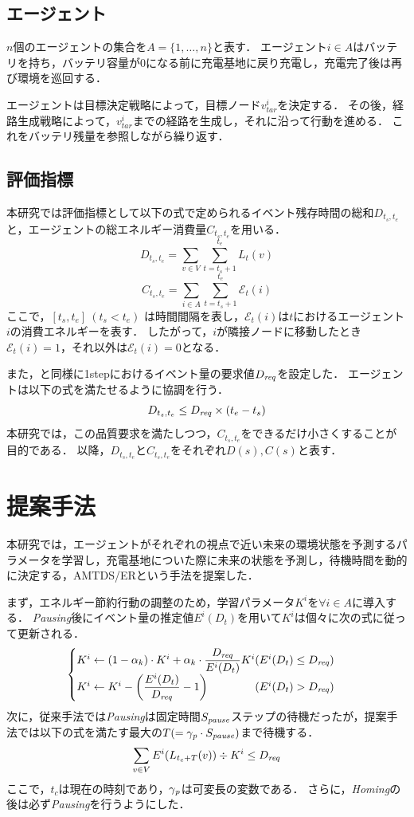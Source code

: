 \documentclass[11pt,a4j,twocolumn]{jarticle}
\def\AgentSet{A}
\def\Dreq{{D_{\it req}}}
\def\En{\mathcal{E}}
\def\PausingInt{{S_{\it pause}}}
\def\PauseTimeFactor{{\gamma_{\it p}}}
\begin{document}
\subsection{エージェント}
$n$個のエージェントの集合を$\AgentSet=\{1,\dots ,n\}$と表す．
エージェント$i\in\AgentSet$はバッテリを持ち，バッテリ容量が0になる前に充電基地に戻り充電し，充電完了後は再び環境を巡回する．
\par

エージェントは目標決定戦略によって，目標ノード$v^i_{tar}$を決定する．
その後，経路生成戦略によって，$v^i_{tar}$までの経路を生成し，それに沿って行動を進める．
これをバッテリ残量を参照しながら繰り返す．

\subsection{評価指標}
本研究では評価指標として以下の式で定められるイベント残存時間の総和$D_{t_s,t_e}$と，エージェントの総エネルギー消費量$C_{t_s,t_e}$を用いる．
%
\[
  D_{t_s,t_e} = \sum_{v \in V} \sum^{t_e}_{t=t_s+1} L_t(v)
\]
%
\[
  C_{t_s,t_e} = \sum_{i \in \AgentSet} \sum^{t_e}_{t=t_s+1} \En_t(i)
\]
%
ここで，$[t_s,t_e]~(t_s < t_e)$ は時間間隔を表し，$\En_t(i)$は$t$におけるエージェント$i$の消費エネルギーを表す．
したがって，$i$が隣接ノードに移動したとき$\En_t(i)=1$，それ以外は$\En_t(i)=0$となる．
\par
また，\cite{Wu2019}と同様に1stepにおけるイベント量の要求値$\Dreq$を設定した．
エージェントは以下の式を満たせるように協調を行う．
%
\[
  D_{t_s,t_e}\leq \Dreq \times (t_e - t_s)
\]
%
本研究では，この品質要求を満たしつつ，$C_{t_s, t_e}$をできるだけ小さくすることが目的である．
以降，$D_{t_s,t_e}$と$C_{t_s,t_e}$をそれぞれ$D(s), C(s)$と表す．


\section{提案手法}
本研究では，エージェントがそれぞれの視点で近い未来の環境状態を予測するパラメータを学習し，充電基地についた際に未来の状態を予測し，待機時間を動的に決定する，AMTDS/ERという手法を提案した．
\par

まず，エネルギー節約行動の調整のため，学習パラメータ$K^i$を$\forall i\in \AgentSet$に導入する．
{\em Pausing}後にイベント量の推定値$E^i(D_t)$を用いて$K^i$は個々に次の式に従って更新される．
%
\[
  \begin{cases}
    K^i \gets (1 - \alpha_k) \cdot K^i + \alpha_k \cdot \dfrac{\Dreq}{E^i(D_t)}K^i 
    \hfill (E^i(D_t) \leq \Dreq)\\
    K^i \gets K^i - \left( \dfrac{E^i(D_t)}{\Dreq} - 1 \right) 
    \hfill (E^i(D_t) > \Dreq)
  \end{cases}
\]
%
次に，従来手法\cite{Wu2019}では{\em Pausing}は固定時間$\PausingInt$ステップの待機だったが，提案手法では以下の式を満たす最大の$T (= \PauseTimeFactor\cdot\PausingInt)$まで待機する．
% 
\[
 \sum_{v \in V} E^i(L_{t_c+T}(v)) \div K^i \leq \Dreq
\] 
%
ここで，$t_c$は現在の時刻であり，$\PauseTimeFactor$は可変長の変数である．
さらに，{\em Homing}の後は必ず{\em Pausing}を行うようにした．
\end{document}
